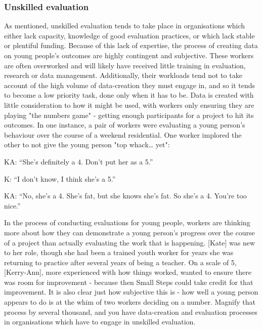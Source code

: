 \subsubsection{Unskilled evaluation}
As mentioned, unskilled evaluation tends to take place in organisations which either lack capacity, knowledge of good evaluation practices, or which lack stable or plentiful funding. Because of this lack of expertise, the process of creating data on young people's outcomes are highly contingent and subjective. These workers are often overworked and will likely have received little training in evaluation, research or data management. Additionally, their workloads tend not to take account of the high volume of data-creation they must engage in, and so it tends to become a low priority task, done only when it has to be. Data is created with little consideration to how it might be used, with workers only ensuring they are playing "the numbers game" - getting enough participants for a project to hit its outcomes. In one instance, a pair of workers were evaluating a young person’s behaviour over the course of a weekend residential. One worker implored the other to not give the young person "top whack… yet":

KA: “She’s definitely a 4. Don’t put her as a 5.”

K: “I don’t know, I think she’s a 5.”

KA: “No, she’s a 4. She’s fat, but she knows she’s fat. So she’s a 4. You’re too nice.”

In the process of conducting evaluations for young people, workers are thinking more about how they can demonstrate a young person’s progress over the course of a project than actually evaluating the work that is happening. [Kate] was new to her role, though she had been a trained youth worker for years she was returning to practice after several years of being a teacher. On a scale of 5, [Kerry-Ann], more experienced with how things worked, wanted to ensure there was room for improvement - because then Small Steps could take credit for that improvement. It is also clear just how subjective this is - how well a young person appears to do is at the whim of two workers deciding on a number. Magnify that process by several thousand, and you have data-creation and evaluation processes in organisations which have to engage in unskilled evaluation.

